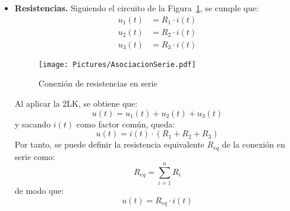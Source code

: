 \documentclass[11pt]{book} %
\numberwithin{dummy}{section}
\theoremstyle{ocrenumbox}
\theoremstyle{blacknumex}
\theoremstyle{blacknumbox}
\theoremstyle{ocrenum}
\begin{document}
	\begin{itemize}
		\item \textbf{Resistencias.} Siguiendo el circuito de la Figura~\ref{fig.serie}, se cumple que:
		\begin{align*}
			u_1(t) &= R_1 \cdot i(t)\\
			u_2(t) &= R_2 \cdot i(t)\\
			u_3(t) &= R_3 \cdot i(t)
		\end{align*}
		\begin{figure}[htbp]
			\centering
			\texttt{[image: Pictures/AsociacionSerie.pdf]}
			\caption{Conexión de resistencias en serie}
			\label{fig.serie}
		\end{figure}
		Al aplicar la 2LK, se obtiene que: 
		\begin{equation*}
			u(t) = u_1(t) + u_2(t) + u_3(t)
		\end{equation*}
		y sacando $i(t)$ como factor común, queda:
		\begin{equation*}
			u(t) = i(t) \cdot (R_1 + R_2 + R_3)
		\end{equation*}
		Por tanto, se puede definir la resistencia equivalente $R_{eq}$ de la conexión en serie como:
		\begin{equation}
			\boxed{R_{eq} = \sum_{i = 1}^n R_i}
		\end{equation}
		de modo que:
		\begin{equation*}
			u(t) = R_{eq} \cdot i(t)
		\end{equation*}
		

\end{itemize}
\end{document}
